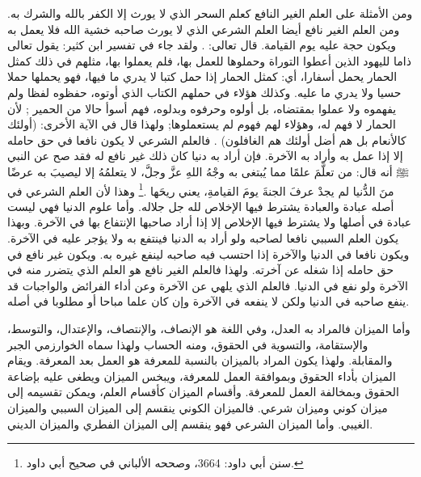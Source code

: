 ومن الأمثلة على العلم الغير النافع كعلم السحر الذي لا يورث إلا الكفر بالله والشرك به. ومن العلم الغير نافع أيضا العلم الشرعي الذي لا يورث صاحبه خشية الله فلا يعمل به ويكون حجة عليه يوم القيامة. قال تعالى: \quranayah*[62][5]{\footnotesize \surahname*[62]}. ولقد جاء في تفسير ابن كثير: يقول تعالى ذاما لليهود الذين أعطوا التوراة وحملوها للعمل بها، فلم يعملوا بها، مثلهم في ذلك كمثل الحمار يحمل أسفارا، أي: كمثل الحمار إذا حمل كتبا لا يدري ما فيها، فهو يحملها حملا حسيا ولا يدري ما عليه. وكذلك هؤلاء في حملهم الكتاب الذي أوتوه، حفظوه لفظا ولم يفهموه ولا عملوا بمقتضاه، بل أولوه وحرفوه وبدلوه، فهم أسوأ حالا من الحمير ; لأن الحمار لا فهم له، وهؤلاء لهم فهوم لم يستعملوها; ولهذا قال في الآية الأخرى: (أولئك كالأنعام بل هم أضل أولئك هم الغافلون) \href{https://shamela.ws/book/8473/4163#p5}{\faExternalLink} \cite{tafsir_ibnKathir}. فالعلم الشرعي لا يكون نافعا في حق حامله إلا إذا عمل به وأراد به الآخرة. فإن أراد به دنيا كان ذلك غير نافع له فقد صح عن النبي ﷺ أنه قال: من تعلَّمَ علمًا مما يُبتغى به وجْهُ اللهِ عزَّ وجلَّ، لا يتعلمُهُ إلا ليصيبَ به عرضًا منَ الدُّنيا لم يجدْ عرفَ الجنةَ يومَ القيامةِ، يعني ريحَها \href{https://shamela.ws/book/117359/3086#p1}{\faExternalLink} \cite{SunanAbiDawood}.\footnote{سنن أبي داود: 3664، وصححه الألباني في صحيح أبي داود.} وهذا لأن العلم الشرعي في أصله عبادة والعبادة يشترط فيها الإخلاص لله جل جلاله. وأما علوم الدنيا فهي ليست عبادة في أصلها ولا يشترط فيها الإخلاص إلا إذا أراد صاحبها الإنتفاع بها في الآخرة. وبهذا يكون العلم السببي نافعا لصاحبه ولو أراد به الدنيا فينتفع به ولا يؤجر عليه في الآخرة. ويكون نافعا في الدنيا والآخرة إذا احتسب فيه صاحبه لينفع غيره به. ويكون غير نافع في حق حامله إذا شغله عن آخرته. ولهذا فالعلم الغير نافع هو العلم الذي يتضرر منه في الآخرة ولو نفع في الدنيا. فالعلم الذي يلهي عن الآخرة وعن أداء الفرائض والواجبات قد ينفع صاحبه في الدنيا ولكن لا ينفعه في الآخرة وإن كان علما مباحا أو مطلوبا في أصله.

وأما الميزان فالمراد به العدل، وفي اللغة هو الإنصاف، والإنتصاف، والإعتدال، والتوسط، والإستقامة، والتسوية في الحقوق، ومنه الحساب ولهذا سماه الخوارزمي الجبر والمقابلة. ولهذا يكون المراد بالميزان بالنسبة للمعرفة هو العمل بعد المعرفة. ويقام الميزان بأداء الحقوق وبموافقة العمل للمعرفة، ويبخس الميزان ويطغى عليه بإضاعة الحقوق وبمخالفة العمل للمعرفة. وأقسام الميزان كأقسام العلم، ويمكن تقسيمه إلى ميزان كوني وميزان شرعي. فالميزان الكوني ينقسم إلى الميزان السببي والميزان الغيبي. وأما الميزان الشرعي فهو ينقسم إلى الميزان الفطري والميزان الديني. 

